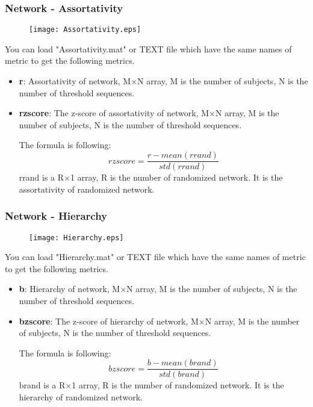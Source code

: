 \documentclass[11pt]{article}
\begin{document}
			\subsubsection{Network - Assortativity}
				\begin{figure}
					\begin{center}
						\texttt{[image: Assortativity.eps]}
					\end{center}
				\end{figure}
				You can load "Assortativity.mat" or TEXT file which have the same names of metric to get the following metrics.
				\begin{itemize}
					\item \textbf{r}: Assortativity of network,
						M$\times$N array, M is the number of subjects, N is the number of threshold sequences.
					\item \textbf{rzscore}: The z-score of assortativity of network,
						M$\times$N array, M is the number of subjects, N is the number of threshold sequences.

						The formula is following:
						$$rzscore=\frac{r-mean(rrand)}{std(rrand)}$$
						rrand is a R$\times$1 array, R is the number of randomized network. 
						It is the assortativity of randomized network.
				\end{itemize}
			\subsubsection{Network - Hierarchy}
				\begin{figure}
					\begin{center}
						\texttt{[image: Hierarchy.eps]}
					\end{center}
				\end{figure}
				You can load "Hierarchy.mat" or TEXT file which have the same names of metric to get the following metrics.
				\begin{itemize}
					\item \textbf{b}: Hierarchy of network,
						M$\times$N array, M is the number of subjects, N is the number of threshold sequences.
					\item \textbf{bzscore}: The z-score of hierarchy of network,
						M$\times$N array, M is the number of subjects, N is the number of threshold sequences.

						The formula is following:
						$$bzscore=\frac{b-mean(brand)}{std(brand)}$$
						brand is a R$\times$1 array, R is the number of randomized network. 
						It is the hierarchy of randomized network.
				\end{itemize}
\end{document}
